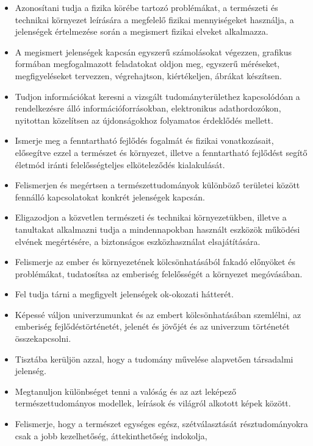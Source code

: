 \begin{itemize}
\item
  Azonosítani tudja a fizika körébe tartozó problémákat, a természeti és
  technikai környezet leírására a megfelelő fizikai mennyiségeket
  használja, a jelenségek értelmezése során a megismert fizikai elveket
  alkalmazza.
\item
  A megismert jelenségek kapcsán egyszerű számolásokat végezzen,
  grafikus formában megfogalmazott feladatokat oldjon meg, egyszerű
  méréseket, megfigyeléseket tervezzen, végrehajtson, kiértékeljen,
  ábrákat készítsen.
\item
  Tudjon információkat keresni a vizsgált tudományterülethez
  kapcsolódóan a rendelkezésre álló információforrásokban, elektronikus
  adathordozókon, nyitottan közelítsen az újdonságokhoz folyamatos
  érdeklődés mellett.
\item
  Ismerje meg a fenntartható fejlődés fogalmát és fizikai vonatkozásait,
  elősegítve ezzel a természet és környezet, illetve a fenntartható
  fejlődést segítő életmód iránti felelősségteljes elköteleződés
  kialakulását.
\item
  Felismerjen és megértsen a természettudományok különböző területei
  között fennálló kapcsolatokat konkrét jelenségek kapcsán.
\item
  Eligazodjon a közvetlen természeti és technikai környezetükben,
  illetve a tanultakat alkalmazni tudja a mindennapokban használt
  eszközök működési elvének megértésére, a biztonságos eszközhasználat
  elsajátítására.
\item
  Felismerje az ember és környezetének kölcsönhatásából fakadó előnyöket
  és problémákat, tudatosítsa az emberiség felelősségét a környezet
  megóvásában.
\item
  Fel tudja tárni a megfigyelt jelenségek ok-okozati hátterét.
\item
  Képessé váljon univerzumunkat és az embert kölcsönhatásában szemlélni,
  az emberiség fejlődéstörténetét, jelenét és jövőjét és az univerzum
  történetét összekapcsolni.
\item
  Tisztába kerüljön azzal, hogy a tudomány művelése alapvetően
  társadalmi jelenség.
\item
  Megtanuljon különbséget tenni a valóság és az azt leképező
  természettudományos modellek, leírások és világról alkotott képek
  között.
\item
  Felismerje, hogy a természet egységes egész, szétválasztását
  résztudományokra csak a jobb kezelhetőség, áttekinthetőség indokolja,

\end{itemize}
